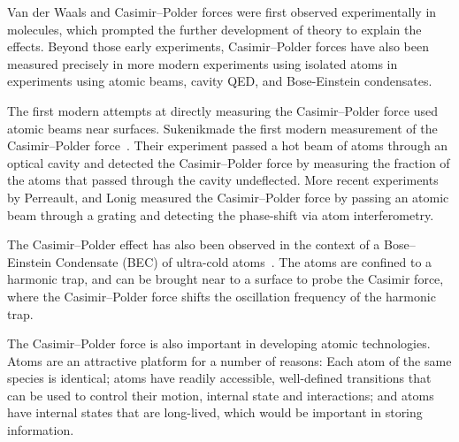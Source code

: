 Van der Waals and Casimir--Polder forces were first observed experimentally in molecules, 
which prompted the further development of theory to explain the effects.  
Beyond those early experiments, Casimir--Polder forces have also been measured precisely in more modern experiments  
using isolated atoms in experiments using atomic beams, cavity QED, and Bose-Einstein condensates.  

The first modern attempts at directly measuring the Casimir--Polder force used atomic beams 
near surfaces.  Sukenik\etal made the first modern measurement of the Casimir--Polder force~\cite{Sukenik1993}.
Their experiment passed a hot beam of atoms through an optical cavity and detected
the Casimir--Polder force by measuring the fraction of the atoms that passed through the cavity undeflected. 
More recent experiments by Perreault\etal\cite{Perreault2005}, and Lonig\etal\cite{Lonij2009} measured 
the Casimir--Polder force by passing an atomic beam through a grating and detecting the phase-shift via atom interferometry.  

The Casimir--Polder effect has also been observed in the context of a Bose--Einstein Condensate (BEC)
of ultra-cold atoms~\cite{Harber2005,Obrecht2007}.  %
The atoms are confined to a harmonic trap, and can be brought near to a surface to probe the Casimir
force, where the Casimir--Polder force shifts the oscillation frequency of the harmonic trap.

The Casimir--Polder force is also important in developing atomic technologies.  
Atoms are an attractive platform for a number of reasons:
Each atom of the same species is identical; 
atoms have readily accessible, well-defined transitions that can be used to control their motion,
internal state and interactions; and atoms
have internal states that are long-lived, which would be important in storing information.

